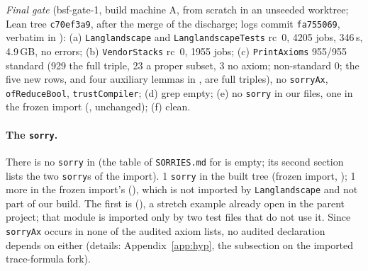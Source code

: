 \emph{Final gate} (bsf-gate-1, build machine A, from scratch in an unseeded worktree; Lean tree \texttt{c70ef3a9}, after the merge of
the  discharge; logs commit \texttt{fa755069}, verbatim in ): (a) \texttt{Langlandscape} and \texttt{LanglandscapeTests}
rc~0, 4205 jobs, 346\,s, 4.9\,GB, no errors; (b) \texttt{VendorStacks} rc~0, 1955 jobs; (c) \texttt{PrintAxioms} 955/955 standard
(929 the full triple, 23 a proper subset, 3 no axiom; non-standard 0; the five new rows, \BSFdischargeName{} and four auxiliary
lemmas in , are full triples), no \texttt{sorryAx}, \texttt{ofReduceBool}, \texttt{trustCompiler}; (d) grep empty;
(e) no \texttt{sorry} in our files, one in the frozen import (, unchanged); (f)  clean.

\paragraph{The \texttt{sorry}.} There is no \texttt{sorry} in  (the table of
\texttt{SORRIES.md} for  is empty; its second section lists the two \texttt{sorry}s of the import).
1 \texttt{sorry} in the built tree (frozen import, ); 1 more in the frozen import's
 (), which is not imported by
\texttt{Langlandscape} and not part of our build. The first is 
(), a stretch example already open in the parent project; that module is imported only by two
test files that do not use it. Since \texttt{sorryAx} occurs in none of the \NumAuditedRows{}
audited axiom lists, no audited declaration depends on either (details: Appendix~\ref{app:hyp}, the subsection on the imported trace-formula fork).

